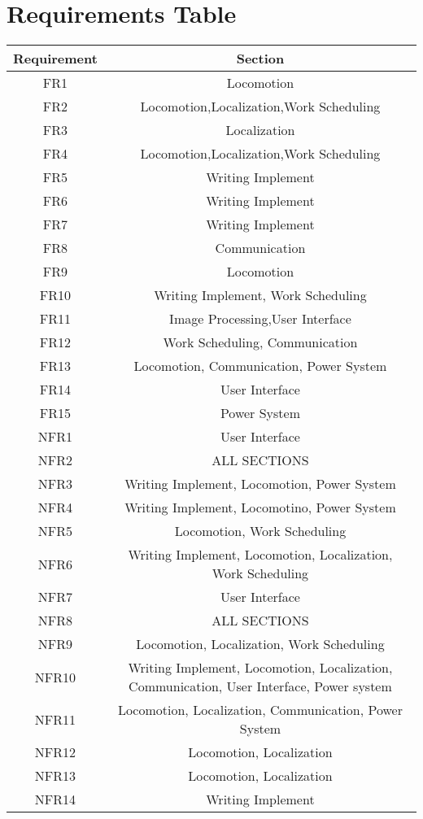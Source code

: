 
\section{Requirements Table}

\begin{center}
 \begin{tabular}{||c c ||} 
 \hline
 Requirement & Section \\ [0.5ex] 
 \hline\hline
 FR1 & Locomotion  \\ 
 \hline
 FR2 & Locomotion,Localization,Work Scheduling \\
 \hline
 FR3 & Localization \\
 \hline
 FR4 & Locomotion,Localization,Work Scheduling \\
 \hline
 FR5 & Writing Implement \\
 \hline
 FR6 & Writing Implement \\
 \hline
 FR7 & Writing Implement \\
 \hline
 FR8 & Communication \\
 \hline
 FR9 & Locomotion \\
 \hline
 FR10 & Writing Implement, Work Scheduling \\
 \hline
 FR11 & Image Processing,User Interface \\
 \hline
 FR12 & Work Scheduling, Communication \\
 \hline
 FR13 & Locomotion, Communication, Power System \\
 \hline
 FR14 & User Interface \\
 \hline
 FR15 & Power System \\
 \hline
 NFR1 & User Interface \\
 \hline
 NFR2 & ALL SECTIONS \\
 \hline
 NFR3 & Writing Implement, Locomotion, Power System \\
 \hline
 NFR4 & Writing Implement, Locomotino, Power System \\
 \hline
 NFR5 & Locomotion, Work Scheduling \\
 \hline
 NFR6 & Writing Implement, Locomotion, Localization, Work Scheduling \\
 \hline
 NFR7 & User Interface \\
 \hline
 NFR8 & ALL SECTIONS \\
 \hline
 NFR9 & Locomotion, Localization, Work Scheduling \\
 \hline
 NFR10 & Writing Implement, Locomotion, Localization, Communication, User Interface, Power system \\
 \hline
 NFR11 & Locomotion, Localization, Communication, Power System \\
 \hline
 NFR12 & Locomotion, Localization \\
 \hline
 NFR13 & Locomotion, Localization \\
 \hline
 NFR14 & Writing Implement \\ [1ex]
\hline
\end{tabular}
\end{center}